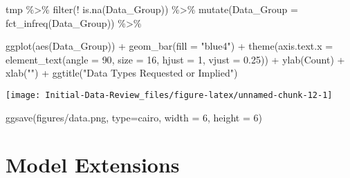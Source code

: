 \documentclass[
]{article}
\newenvironment{Shaded}{\begin{snugshade}}{\end{snugshade}}
\newcommand{\AttributeTok}[1]{\textcolor[rgb]{0.77,0.63,0.00}{#1}}
\newcommand{\DecValTok}[1]{\textcolor[rgb]{0.00,0.00,0.81}{#1}}
\newcommand{\FloatTok}[1]{\textcolor[rgb]{0.00,0.00,0.81}{#1}}
\newcommand{\FunctionTok}[1]{\textcolor[rgb]{0.00,0.00,0.00}{#1}}
\newcommand{\NormalTok}[1]{#1}
\newcommand{\SpecialCharTok}[1]{\textcolor[rgb]{0.00,0.00,0.00}{#1}}
\newcommand{\StringTok}[1]{\textcolor[rgb]{0.31,0.60,0.02}{#1}}
\begin{document}
\begin{Shaded}
\begin{Highlighting}[]
\NormalTok{tmp }\SpecialCharTok{\%\textgreater{}\%}
  \FunctionTok{filter}\NormalTok{(}\SpecialCharTok{!} \FunctionTok{is.na}\NormalTok{(Data\_Group))  }\SpecialCharTok{\%\textgreater{}\%}
  \FunctionTok{mutate}\NormalTok{(}\AttributeTok{Data\_Group =} \FunctionTok{fct\_infreq}\NormalTok{(Data\_Group)) }\SpecialCharTok{\%\textgreater{}\%}
   
  \FunctionTok{ggplot}\NormalTok{(}\FunctionTok{aes}\NormalTok{(Data\_Group)) }\SpecialCharTok{+}
  \FunctionTok{geom\_bar}\NormalTok{(}\AttributeTok{fill =} \StringTok{"blue4"}\NormalTok{) }\SpecialCharTok{+}
  \FunctionTok{theme}\NormalTok{(}\AttributeTok{axis.text.x =} \FunctionTok{element\_text}\NormalTok{(}\AttributeTok{angle =} \DecValTok{90}\NormalTok{, }\AttributeTok{size =} \DecValTok{16}\NormalTok{,}
                                   \AttributeTok{hjust =} \DecValTok{1}\NormalTok{, }\AttributeTok{vjust =} \FloatTok{0.25}\NormalTok{)) }\SpecialCharTok{+}
  \FunctionTok{ylab}\NormalTok{(}\StringTok{\textquotesingle{}Count\textquotesingle{}}\NormalTok{) }\SpecialCharTok{+}
  \FunctionTok{xlab}\NormalTok{(}\StringTok{""}\NormalTok{) }\SpecialCharTok{+}
  \FunctionTok{ggtitle}\NormalTok{(}\StringTok{"Data Types Requested or Implied"}\NormalTok{)}
\end{Highlighting}
\end{Shaded}

\begin{center}\texttt{[image: Initial-Data-Review\_files/figure-latex/unnamed-chunk-12-1]} \end{center}

\begin{Shaded}
\begin{Highlighting}[]
\FunctionTok{ggsave}\NormalTok{(}\StringTok{\textquotesingle{}figures/data.png\textquotesingle{}}\NormalTok{, }\AttributeTok{type=}\StringTok{\textquotesingle{}cairo\textquotesingle{}}\NormalTok{,}
         \AttributeTok{width =} \DecValTok{6}\NormalTok{, }\AttributeTok{height =} \DecValTok{6}\NormalTok{)}
\end{Highlighting}
\end{Shaded}

\hypertarget{model-extensions}{%
\section{Model Extensions}\label{model-extensions}}
\end{document}
